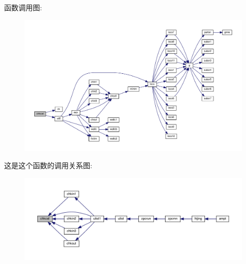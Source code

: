 函数调用图\+:
\nopagebreak
\begin{figure}[H]
\begin{center}
\leavevmode
\includegraphics[width=350pt]{chkcel_8f90_a7480f13fdd6684db8dfb1d67a5fecd37_cgraph}
\end{center}
\end{figure}
这是这个函数的调用关系图\+:
\nopagebreak
\begin{figure}[H]
\begin{center}
\leavevmode
\includegraphics[width=350pt]{chkcel_8f90_a7480f13fdd6684db8dfb1d67a5fecd37_icgraph}
\end{center}
\end{figure}
